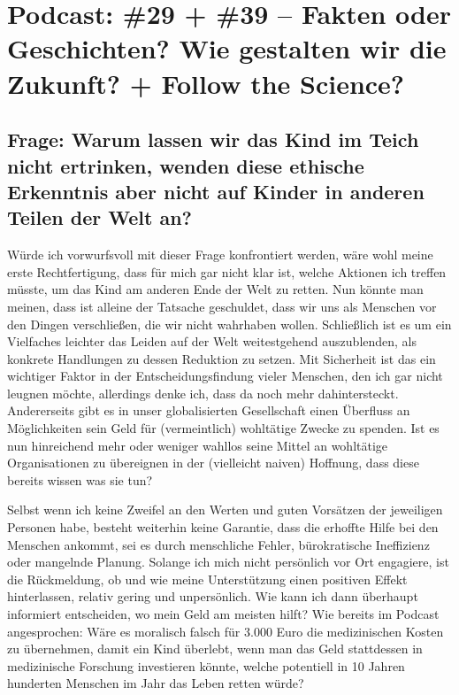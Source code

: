 \documentclass[twoside, a4paper, DIV=11, open=any, bibliography=totoc]{scrbook}
\begin{document}
\section{Podcast: \#29 + \#39 -- Fakten oder Geschichten? Wie gestalten wir die Zukunft?
+ Follow the Science?}

\subsection{Frage: Warum lassen wir das Kind im Teich nicht ertrinken,
wenden diese ethische Erkenntnis aber nicht auf Kinder in anderen Teilen der Welt an?}

Würde ich vorwurfsvoll mit dieser Frage konfrontiert werden, wäre wohl meine
erste Rechtfertigung, dass für mich gar nicht klar ist, welche Aktionen ich treffen
müsste, um das Kind am anderen Ende der Welt zu retten. Nun könnte man meinen,
dass ist alleine der Tatsache geschuldet, dass wir uns als Menschen vor den Dingen
verschließen, die wir nicht wahrhaben wollen. Schließlich ist es um ein Vielfaches
leichter das Leiden auf der Welt weitestgehend auszublenden, als konkrete Handlungen
zu dessen Reduktion zu setzen.
Mit Sicherheit ist das ein wichtiger Faktor in der Entscheidungsfindung vieler Menschen,
den ich gar nicht leugnen möchte, allerdings denke ich, dass da noch mehr dahintersteckt.
Andererseits gibt es in unser globalisierten Gesellschaft einen Überfluss an
Möglichkeiten sein Geld für (vermeintlich) wohltätige Zwecke zu spenden.
Ist es nun hinreichend mehr oder weniger wahllos seine Mittel an wohltätige Organisationen
zu übereignen in der (vielleicht naiven) Hoffnung, dass diese bereits wissen was sie tun?

Selbst wenn ich keine Zweifel an den Werten und guten Vorsätzen der jeweiligen Personen
habe, besteht weiterhin keine Garantie, dass die erhoffte Hilfe bei den Menschen ankommt,
sei es durch menschliche Fehler, bürokratische Ineffizienz oder mangelnde Planung.
Solange ich mich nicht persönlich vor Ort engagiere, ist die Rückmeldung, ob und wie
meine Unterstützung einen positiven Effekt hinterlassen, relativ gering und unpersönlich.
Wie kann ich dann überhaupt informiert entscheiden, wo mein Geld am meisten hilft?
Wie bereits im Podcast angesprochen: Wäre es moralisch falsch für 3.000 Euro die medizinischen
Kosten zu übernehmen, damit ein Kind überlebt, wenn man das Geld stattdessen in
medizinische Forschung investieren könnte, welche potentiell in 10 Jahren hunderten
Menschen im Jahr das Leben retten würde?
\end{document}

